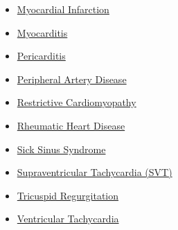 \begin{itemize}[noitemsep]
  \item \hyperlink{sec:Myocardial Infarction}{Myocardial Infarction}
  \item \hyperlink{sec:Myocarditis}{Myocarditis}
  \item \hyperlink{sec:Pericarditis}{Pericarditis}
  \item \hyperlink{sec:Peripheral Artery Disease}{Peripheral Artery Disease}
  \item \hyperlink{sec:Restrictive Cardiomyopathy}{Restrictive Cardiomyopathy}
  \item \hyperlink{sec:Rheumatic Heart Disease}{Rheumatic Heart Disease}
  \item \hyperlink{sec:Sick Sinus Syndrome}{Sick Sinus Syndrome}
  \item \hyperlink{sec:Supraventricular Tachycardia}{Supraventricular Tachycardia (SVT)}
  \item \hyperlink{sec:Tricuspid Regurgitation}{Tricuspid Regurgitation}
  \item \hyperlink{sec:Ventricular Tachycardia}{Ventricular Tachycardia}
\end{itemize}

